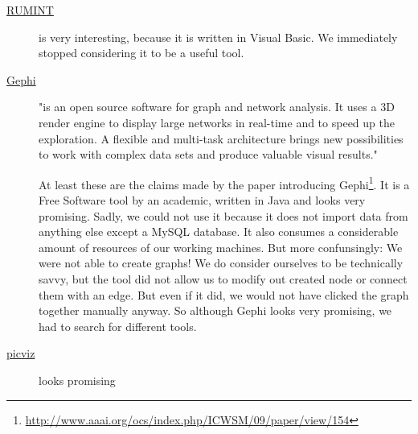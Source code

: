 \documentclass[a4paper,
    11pt,
    normalheadings,
    parindent,
    UKenglish,
    abstracton,
    ]{scrartcl}
\begin{document}
\begin{description}
    \item[\href{http://www.rumint.org/}{RUMINT}]
        is very interesting, because it is written in Visual Basic.
        We immediately stopped considering it to be a useful tool.

    \item[\href{http://www.gephi.org}{Gephi}]
        "is an open source software for graph and network analysis. It uses a 3D render engine to display large networks in real-time and to speed up the exploration. A flexible and multi-task architecture brings new possibilities to work with complex data sets and produce valuable visual results."

        At least these are the claims made by the paper introducing Gephi\footnote{\url{http://www.aaai.org/ocs/index.php/ICWSM/09/paper/view/154}}.
        It is a Free Software tool by an academic, written in Java and looks very promising.
        Sadly, we could not use it because it does not import data from anything else except a MySQL database.
        It also consumes a considerable amount of resources of our working machines.
        But more confunsingly: We were not able to create graphs!
        We do consider ourselves to be technically savvy, but the tool did not allow us to modify out created node or connect them with an edge.
        But even if it did, we would not have clicked the graph together manually anyway.
        So although Gephi looks very promising, we had to search for different tools.

    \item[\href{http://www.wallinfire.net/picviz/screenshots/index.html}{picviz}] looks promising
\end{description}
\end{document}
